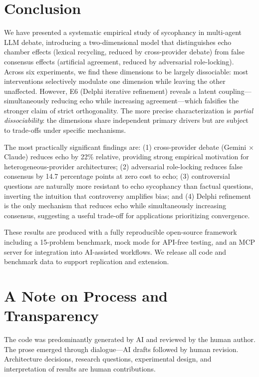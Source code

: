 \documentclass[11pt]{article}
\begin{document}
\section{Conclusion}
\label{sec:conclusion}

We have presented a systematic empirical study of sycophancy in multi-agent LLM debate, introducing a two-dimensional model that distinguishes echo chamber effects (lexical recycling, reduced by cross-provider debate) from false consensus effects (artificial agreement, reduced by adversarial role-locking). Across six experiments, we find these dimensions to be largely dissociable: most interventions selectively modulate one dimension while leaving the other unaffected. However, E6 (Delphi iterative refinement) reveals a latent coupling---simultaneously reducing echo while increasing agreement---which falsifies the stronger claim of strict orthogonality. The more precise characterization is \textit{partial dissociability}: the dimensions share independent primary drivers but are subject to trade-offs under specific mechanisms.

The most practically significant findings are: (1) cross-provider debate (Gemini $\times$ Claude) reduces echo by 22\% relative, providing strong empirical motivation for heterogeneous-provider architectures; (2) adversarial role-locking reduces false consensus by 14.7 percentage points at zero cost to echo; (3) controversial questions are naturally more resistant to echo sycophancy than factual questions, inverting the intuition that controversy amplifies bias; and (4) Delphi refinement is the only mechanism that reduces echo while simultaneously increasing consensus, suggesting a useful trade-off for applications prioritizing convergence.

These results are produced with a fully reproducible open-source framework including a 15-problem benchmark, mock mode for API-free testing, and an MCP server for integration into AI-assisted workflows. We release all code and benchmark data to support replication and extension.

\section*{A Note on Process and Transparency}
The code was predominantly generated by AI and reviewed by the human author. The prose emerged through dialogue---AI drafts followed by human revision. Architecture decisions, research questions, experimental design, and interpretation of results are human contributions.



\end{document}
